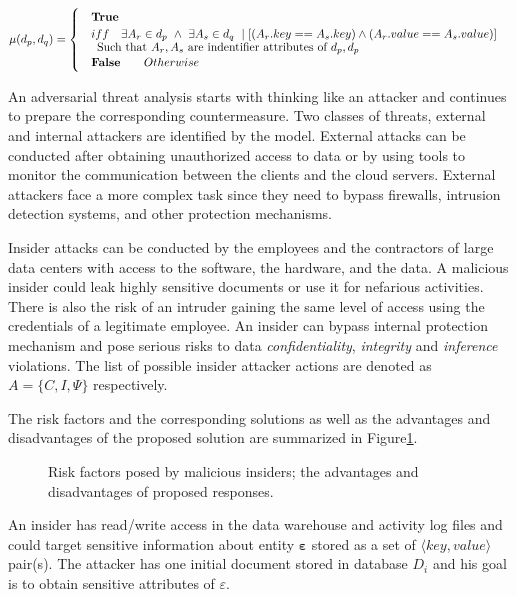 \begin{equation}
\label{eq:muFunction}
\begin{aligned}
& \mu(d_p,d_q)= \begin{cases}
&\textbf{True} \\
&iff \quad \exists A_r \in d_p ~ \land ~\exists A_s \in d_q ~ \mid [(A_r.key==A_s.key) \land (A_r.value==A_s.value)]\\
\noalign{\text{Such that $A_r, A_s$ are indentifier attributes of $d_p, d_p$}}
&\textbf{False} \qquad Otherwise
\end{cases}
\end{aligned}
\end{equation}

An adversarial threat analysis starts with thinking like an attacker and continues to prepare the corresponding countermeasure. Two classes of threats, external and internal attackers are identified by the model. External attacks can be conducted after obtaining unauthorized access to data or by using tools to monitor the communication between the clients and the cloud servers. External attackers face a more complex task since they need to bypass firewalls, intrusion detection systems, and other protection mechanisms.


Insider attacks can be conducted by the employees and the contractors of large data centers with access to the software, the hardware, and the data. A malicious insider could leak highly sensitive documents or use it for nefarious activities. There is also the risk of an intruder gaining the same level of access using the credentials of a legitimate employee. An insider can bypass internal protection mechanism and pose serious risks to data \textit{confidentiality}, \textit{integrity} and \textit{inference} violations. The list of possible insider attacker actions are denoted as $A=\{C, I,\Psi \}$ respectively.

The risk factors and the corresponding solutions as well as the advantages and disadvantages of the proposed solution are summarized in Figure\ref{fig:MIriskFactors}.

\begin{figure}[H]
\centering
\resizebox{0.9\textwidth}{!}{}
\caption{Risk factors posed by malicious insiders; the advantages and disadvantages of proposed responses.}
\label{fig:MIriskFactors}
\end{figure}

\noindent An insider has read/write access in the data warehouse and activity log files and could target sensitive information about entity $\bm{\varepsilon}$ stored as a set of $\langle key, value \rangle$ pair(s). The attacker has one initial document stored in database $D_i$ and his goal is to obtain sensitive attributes of $\varepsilon$. 

